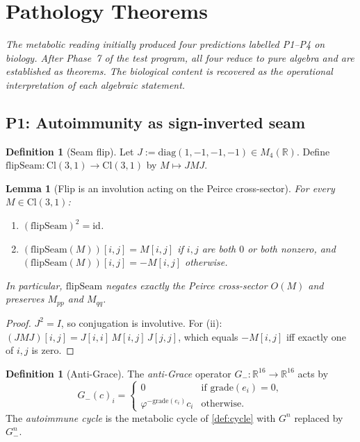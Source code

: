 \documentclass[11pt,a4paper]{article}
\theoremstyle{plain}
\newtheorem{lemma}[theorem]{Lemma}
\theoremstyle{definition}
\newtheorem{definition}[theorem]{Definition}
\theoremstyle{remark}
\numberwithin{equation}{section}
\providecommand{\Cl}{\mathrm{Cl}}
\providecommand{\R}{\mathbb{R}}
\providecommand{\vp}{\varphi}
\newenvironment{sectionopener}
  {\begin{sectionopenerframe}\small\itshape\ignorespaces}
  {\end{sectionopenerframe}}
\begin{document}
\section{Pathology Theorems}
\label{sec:predictions}

\begin{sectionopener}
The metabolic reading initially produced four \emph{predictions}
labelled P1--P4 on biology. After Phase~7 of the test program, all
four reduce to pure algebra and are established as theorems.
The biological content is recovered as the operational interpretation
of each algebraic statement.
\end{sectionopener}

\subsection{P1: Autoimmunity as sign-inverted seam}

\begin{definition}[Seam flip]
\label{def:flip}
Let $J := \mathrm{diag}(1, -1, -1, -1) \in M_4(\R)$. Define
$\mathrm{flipSeam} : \Cl(3,1) \to \Cl(3,1)$ by $M \mapsto J M J$.
\end{definition}

\begin{lemma}[Flip is an involution acting on the Peirce cross-sector]
\label{lem:flip-action}
For every $M \in \Cl(3,1)$:
\begin{enumerate}[label=(\roman*)]
\item $(\mathrm{flipSeam})^2 = \mathrm{id}$.
\item $(\mathrm{flipSeam}(M))[i,j] = M[i,j]$ if $i, j$ are both $0$ or both nonzero, and $(\mathrm{flipSeam}(M))[i,j] = -M[i,j]$ otherwise.
\end{enumerate}
In particular, $\mathrm{flipSeam}$ negates exactly the Peirce
cross-sector $O(M)$ and preserves $M_{pp}$ and $M_{qq}$.
\end{lemma}

\begin{proof}
$J^2 = I$, so conjugation is involutive. For (ii):
$(JMJ)[i,j] = J[i,i]\, M[i,j]\, J[j,j]$, which equals $-M[i,j]$ iff
exactly one of $i, j$ is zero.
\end{proof}

\begin{definition}[Anti-Grace]
\label{def:anti-grace}
The \emph{anti-Grace} operator $G_- : \R^{16} \to \R^{16}$ acts by
\[
G_-(c)_i = \begin{cases} 0 & \text{if } \mathrm{grade}(e_i) = 0, \\ \vp^{-\mathrm{grade}(e_i)} c_i & \text{otherwise.}\end{cases}
\]
The \emph{autoimmune cycle} is the metabolic cycle of
\cref{def:cycle} with $G^n$ replaced by $G_-^n$.
\end{definition}
\end{document}
